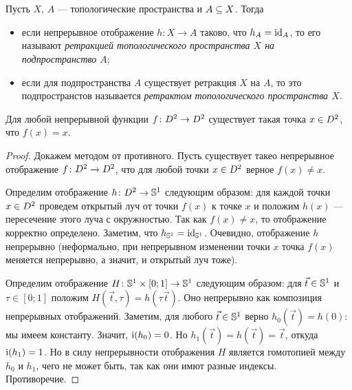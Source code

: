 \documentclass[main]{subfiles}
\begin{document}
\resetcounters

\section{}

\begin{definition}
	Пусть $ X $, $ A $ --- топологические пространства и $ A \ssq X $. Тогда
	\begin{itemize}
		\item если непрерывное отображение $ h \colon X \to A $ таково, что $ h_A = \Id_A $,
			то его называют \emph{ретракцией топологического пространства $ X $ на подпространство $ A $};
		\item если для подпространства $ A $ существует ретракция $ X $ на $ A $, то это подпространстов называется
			\emph{ретрактом топологического пространства $ X $}.
	\end{itemize}
\end{definition}

\begin{theorem}[Бр\'{а}уэра]
	Для любой непрерывной функции $ f \colon \D^2 \to \D^2 $ существует такая точка $ x \in \D^2 $, что $ f(x) = x $.
\end{theorem}

\begin{proof}
	Докажем методом от противного. Пусть существует такео непрерывное отображение $ f \colon \D^2 \to \D^2 $,
	что для любой точки $ x \in \D^2 $ верное $ f(x) \neq x $.

	Определим отображение $ h  \colon \D^2 \to \S^1 $ следующим образом: для каждой точки $ x \in \D^2 $ проведем
	открытый луч от точки $ f(x) $ к точке $ x $ и положим $ h(x) $ --- пересечение этого луча с окружностью.
	Так как $ f(x) \neq x $, то отображение корректно определено. Заметим, что $ h_{\S^1} = \Id_{\S^1} $.
	Очевидно, отображение $ h $ непрерывно (неформально, при непрерывном изменении точки $ x $ точка $ f(x) $
	меняется непрерывно, а значит, и открытый луч тоже).

	Определим отображение $ H \colon \S^1 \times [0;1] \to \S^1 $ следующим образом: для $ \vec{t} \in \S^1 $ и
	$ \tau \in [0;1] $ положим $ H(\vec{t}, \tau) = h(\tau \vec{t}) $. Оно непрерывно как композиция непрерывных
	отображений. Заметим, для любого $ \vec{t} \in \S^1 $ верно $ h_0(\vec{t}) = h(0) $:
	мы имеем константу. Значит, $ \Ind(h_0) = 0 $. Но $ h_1(\vec{t}) = h(\vec{t}) = \vec{t} $, откуда
	$ \Ind(h_1) = 1 $. Но в силу непрерывности отображения $ H $ является гомотопией между $ h_0 $ и $ h_1 $, чего
	не может быть, так как они имют разные индексы. Противоречие.
\end{proof}
\end{document}
